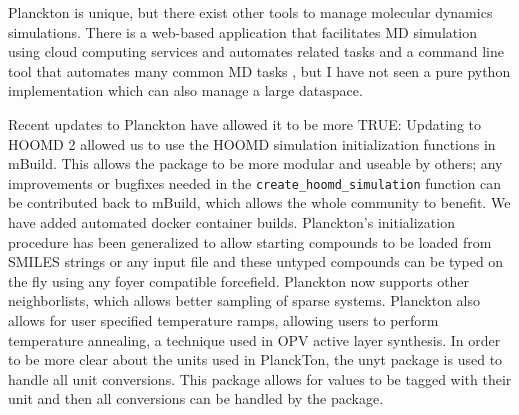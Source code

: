 Planckton is unique, but there exist other tools to manage molecular dynamics simulations. There is a web-based application that facilitates MD simulation using cloud computing services and automates related tasks \citep{Nicolas-Barreales2021} and a command line tool that automates many common MD tasks \citep{Rackers2018}, but I have not seen a pure python implementation which can also manage a large dataspace.

Recent updates to Planckton have allowed it to be more TRUE: 
Updating to HOOMD 2 allowed us to use the HOOMD simulation initialization functions in mBuild. This allows the package to be more modular and useable by others; any improvements or bugfixes needed in the \lstinline{create_hoomd_simulation} function can be contributed back to mBuild, which allows the whole community to benefit.
We have added automated docker container builds.
Planckton's initialization procedure has been generalized to allow starting compounds to be loaded from SMILES strings or any input file and these untyped compounds can be typed on the fly using any foyer compatible forcefield.
Planckton now supports other neighborlists, which allows better sampling of sparse systems. 
Planckton also allows for user specified temperature ramps, allowing users to perform temperature annealing, a technique used in OPV active layer synthesis.
In order to be more clear about the units used in PlanckTon, the unyt package is used to handle all unit conversions. This package allows for values to be tagged with their unit and then all conversions can be handled by the package.

